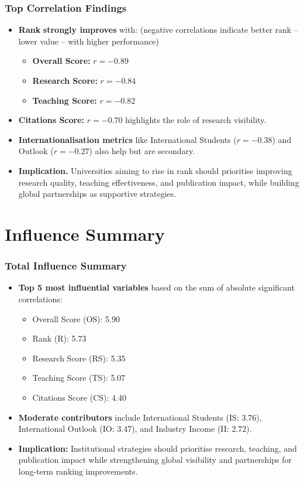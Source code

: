\documentclass[aspectratio=169, table]{beamer}
\begin{document}
\begin{frame}
	\vspace{20pt}
	\frametitle{Top Correlation Findings}
	\begin{itemize}
		\item \textbf{Rank} \textbf{strongly improves} with: (negative correlations indicate better rank -- lower value -- with higher performance)
		\begin{itemize}
			\item \textbf{Overall Score:} $r = -0.89$
			\item \textbf{Research Score:} $r = -0.84$
			\item \textbf{Teaching Score:} $r = -0.82$
		\end{itemize}
		\item \textbf{Citations Score:} $r = -0.70$ highlights the role of research visibility.
		\item \textbf{Internationalisation metrics} like International Students ($r = -0.38$) and Outlook ($r = -0.27$) also help but are secondary.
		\item \textbf{Implication.} Universities aiming to rise in rank should prioritise improving research quality, teaching effectiveness, and publication impact, while building global partnerships as supportive strategies.
		
	\end{itemize}
\end{frame}



\section{Influence Summary}
\begin{frame}
	\vspace{20pt}
	\frametitle{Total Influence Summary}
	\begin{itemize}
		\item \textbf{Top 5 most influential variables} based on the sum of absolute significant correlations:
		\begin{itemize}
			\item Overall Score (OS): 5.90
			\item Rank (R): 5.73
			\item Research Score (RS): 5.35
			\item Teaching Score (TS): 5.07
			\item Citations Score (CS): 4.40
		\end{itemize}
		\item \textbf{Moderate contributors} include International Students (IS: 3.76), International Outlook (IO: 3.47), and Industry Income (II: 2.72).
		\item \textbf{Implication:} Institutional strategies should prioritise research, teaching, and publication impact while strengthening global visibility and partnerships for long-term ranking improvements.
	\end{itemize}
\end{frame}
\end{document}
